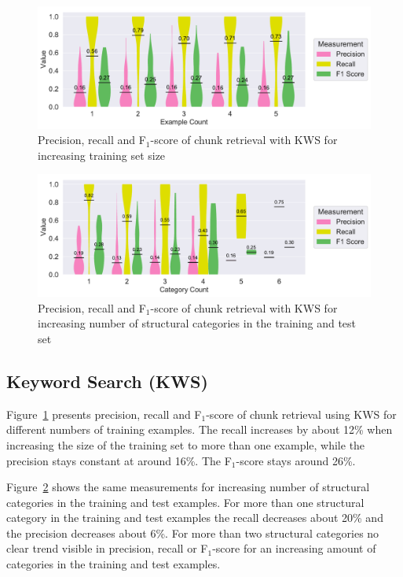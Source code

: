 \documentclass[\myrootdir/main.tex]{subfiles}
\begin{document}
\begin{figure}[htbp]
		\centering
		\includegraphics[width=\textwidth, clip]{img/big-study/recall-precision-examplecount-KWS.pdf}
		\caption{Precision, recall and F$_{1}$-score of chunk retrieval with KWS for increasing training set size}
		\label{fig:recall-precision-examplecount-KWS}
\end{figure}

\begin{figure}[htbp]
		\centering
		\includegraphics[width=\textwidth, clip]{img/big-study/recall-precision-categorycount-KWS.pdf}
		\caption{Precision, recall and F$_{1}$-score of chunk retrieval with KWS for increasing number of structural categories in the training and test set}
		\label{fig:recall-precision-categorycount-KWS}
\end{figure}

\subsection{Keyword Search (KWS)}
Figure~\ref{fig:recall-precision-examplecount-KWS} presents precision, recall and F$_{1}$-score of chunk retrieval using KWS for different numbers of training examples.
The recall increases by about 12\% when increasing the size of the training set to more than one example, while the precision stays constant at around 16\%.
The F$_{1}$-score stays around 26\%.

Figure~\ref{fig:recall-precision-categorycount-KWS} shows the same measurements for increasing number of structural categories in the training and test examples.
For more than one structural category in the training and test examples the recall decreases about 20\% and the precision decreases about 6\%.
For more than two structural categories no clear trend visible in precision, recall or F$_{1}$-score for an increasing amount of categories in the training and test examples.
\end{document}
